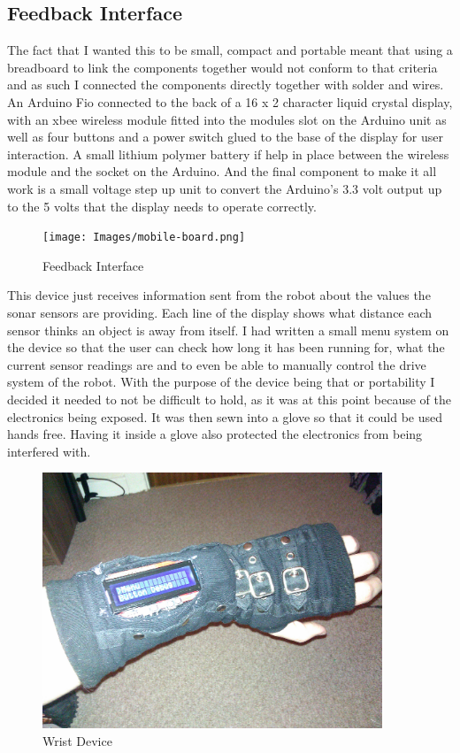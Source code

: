 \subsection{Feedback Interface}
The fact that I wanted this to be small, compact and portable meant that using a breadboard to link the components together would not conform to that criteria and as such I connected the components directly together with solder and wires.
An Arduino Fio connected to the back of a 16 x 2 character liquid crystal display, with an xbee wireless module fitted into the modules slot on the Arduino unit as well as four buttons and a power switch glued to the base of the display for user interaction.  A small lithium polymer battery if help in place between the wireless module and the socket on the Arduino.  And the final component to make it all work is a small voltage step up unit to convert the Arduino's 3.3 volt output up to the 5 volts that the display needs to operate correctly.
\begin{figure}[H]
\centering
        \texttt{[image: Images/mobile-board.png]}
        \caption{Feedback Interface}
        \label{Feedback Interface}
\end{figure}
This device just receives information sent from the robot about the values the sonar sensors are providing.
Each line of the display shows what distance each sensor thinks an object is away from itself.  I had written a small menu system on the device so that the user can check how long it has been running for, what the current sensor readings are and to even be able to manually control the drive system of the robot.
With the purpose of the device being that or portability I decided it needed to not be difficult to hold, as it was at this point because of the electronics being exposed.  It was then sewn into a glove so that it could be used hands free.  Having it inside a glove also protected the electronics from being interfered with.
\begin{figure}[H]
\centering
        \includegraphics[width=4.0in]  {Images/wrist-device.jpg}
        \caption{Wrist Device}
        \label{Wrist Device}
\end{figure}

